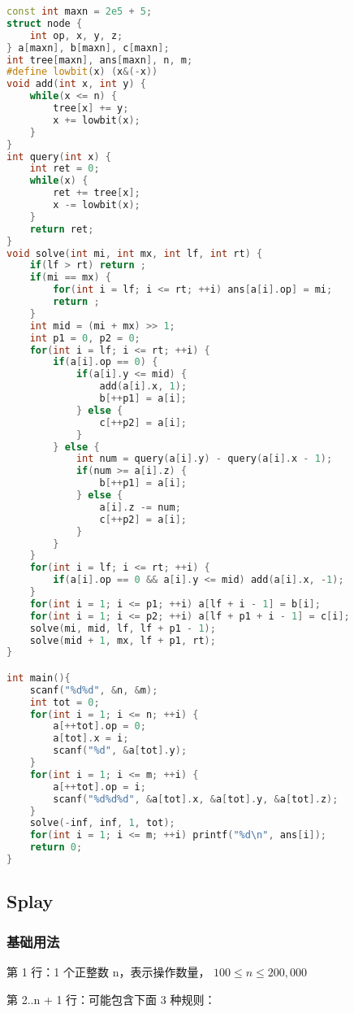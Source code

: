 \begin{lstlisting}[language=C++]
const int maxn = 2e5 + 5;
struct node {
    int op, x, y, z;
} a[maxn], b[maxn], c[maxn];
int tree[maxn], ans[maxn], n, m;
#define lowbit(x) (x&(-x))
void add(int x, int y) {
    while(x <= n) {
        tree[x] += y;
        x += lowbit(x);
    }
}
int query(int x) {
    int ret = 0;
    while(x) {
        ret += tree[x];
        x -= lowbit(x);
    }
    return ret;
}
void solve(int mi, int mx, int lf, int rt) {
    if(lf > rt) return ;
    if(mi == mx) {
        for(int i = lf; i <= rt; ++i) ans[a[i].op] = mi;
        return ;
    }
    int mid = (mi + mx) >> 1;
    int p1 = 0, p2 = 0;
    for(int i = lf; i <= rt; ++i) {
        if(a[i].op == 0) {
            if(a[i].y <= mid) {
                add(a[i].x, 1);
                b[++p1] = a[i];
            } else {
                c[++p2] = a[i];
            }
        } else {
            int num = query(a[i].y) - query(a[i].x - 1);
            if(num >= a[i].z) {
                b[++p1] = a[i];
            } else {
                a[i].z -= num;
                c[++p2] = a[i];
            }
        }
    }
    for(int i = lf; i <= rt; ++i) {
        if(a[i].op == 0 && a[i].y <= mid) add(a[i].x, -1);
    }
    for(int i = 1; i <= p1; ++i) a[lf + i - 1] = b[i];
    for(int i = 1; i <= p2; ++i) a[lf + p1 + i - 1] = c[i];
    solve(mi, mid, lf, lf + p1 - 1);
    solve(mid + 1, mx, lf + p1, rt);
}

int main(){
    scanf("%d%d", &n, &m);
    int tot = 0;
    for(int i = 1; i <= n; ++i) {
        a[++tot].op = 0;
        a[tot].x = i;
        scanf("%d", &a[tot].y);
    }
    for(int i = 1; i <= m; ++i) {
        a[++tot].op = i;
        scanf("%d%d%d", &a[tot].x, &a[tot].y, &a[tot].z);
    }
    solve(-inf, inf, 1, tot);
    for(int i = 1; i <= m; ++i) printf("%d\n", ans[i]);
    return 0;
}
\end{lstlisting}

\subsection{Splay}

\subsubsection{基础用法}

第 1 行：1 个正整数 n，表示操作数量， $100 \le n \le 200,000$

第 2..n + 1 行：可能包含下面 3 种规则：

